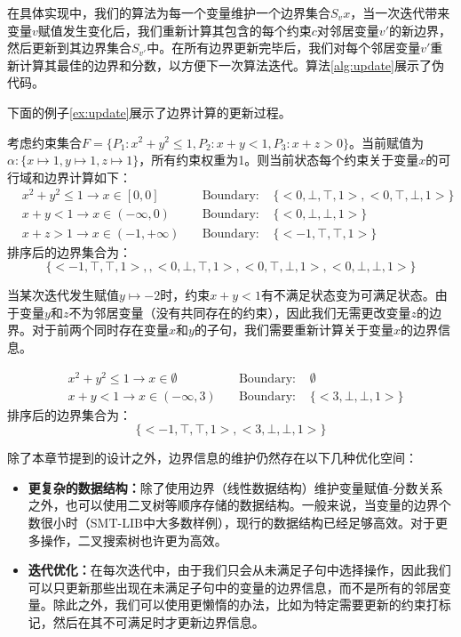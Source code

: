 在具体实现中，我们的算法为每一个变量维护一个边界集合$S_vx$，当一次迭代带来变量$v$赋值发生变化后，我们重新计算其包含的每个约束$c$对邻居变量$v'$的新边界，然后更新到其边界集合$S_{v'}$中。在所有边界更新完毕后，我们对每个邻居变量$v'$重新计算其最佳的边界和分数，以方便下一次算法迭代。算法\ref{alg:update}展示了伪代码。

下面的例子\ref{ex:update}展示了边界计算的更新过程。

\begin{example}
\label{ex:update}
考虑约束集合$F = \{P_1: x^2 + y^2 \leq 1, P_2: x + y < 1, P_3: x + z > 0\}$。当前赋值为$\alpha: \{x \mapsto 1, y \mapsto 1, z \mapsto 1\}$，所有约束权重为1。则当前状态每个约束关于变量$x$的可行域和边界计算如下：
\begin{align}
& x^2 + y^2 \leq 1  \rightarrow x \in [0, 0] \nonumber & \quad \text{Boundary: } & \{<0, \bot, \top, 1>, <0, \top, \bot, 1>\} \nonumber \\
& x + y < 1  \rightarrow x \in (-\infty, 0) \nonumber & \quad \text{Boundary: } & \{<0, \bot, \bot, 1>\} \nonumber \\
& x + z > 1  \rightarrow x \in (-1, +\infty) \nonumber & \quad \text{Boundary: } & \{<-1, \top, \top, 1>\} \nonumber
\end{align}
排序后的边界集合为：
$$
\{<-1, \top, \top, 1>, , <0, \bot, \top, 1>, <0, \top, \bot, 1>, <0, \bot, \bot, 1>\}
$$

当某次迭代发生赋值$y \mapsto -2$时，约束$x + y < 1$有不满足状态变为可满足状态。由于变量$y$和$z$不为邻居变量（没有共同存在的约束），因此我们无需更改变量$z$的边界。对于前两个同时存在变量$x$和$y$的子句，我们需要重新计算关于变量$x$的边界信息。

\begin{align}
& x^2 + y^2 \leq 1  \rightarrow x \in \emptyset \nonumber & \quad \text{Boundary: } & \emptyset \nonumber \\
& x + y < 1  \rightarrow x \in (-\infty, 3) \nonumber & \quad \text{Boundary: } & \{<3, \bot, \bot, 1>\} \nonumber
\end{align}
排序后的边界集合为：
$$
\{<-1, \top, \top, 1>, <3, \bot, \bot, 1>\}
$$
\end{example}

除了本章节提到的设计之外，边界信息的维护仍然存在以下几种优化空间：
\begin{itemize}
    \item \textbf{更复杂的数据结构：}除了使用边界（线性数据结构）维护变量赋值-分数关系之外，也可以使用二叉树等顺序存储的数据结构。一般来说，当变量的边界个数很小时（SMT-LIB中大多数样例），现行的数据结构已经足够高效。对于更多操作，二叉搜索树也许更为高效。
    \item \textbf{迭代优化：}在每次迭代中，由于我们只会从未满足子句中选择操作，因此我们可以只更新那些出现在未满足子句中的变量的边界信息，而不是所有的邻居变量。除此之外，我们可以使用更懒惰的办法，比如为特定需要更新的约束打标记，然后在其不可满足时才更新边界信息。
\end{itemize}

